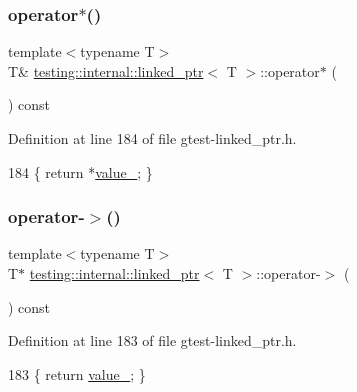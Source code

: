 \subsubsection{\texorpdfstring{operator$\ast$()}{operator*()}}
{\footnotesize\ttfamily template$<$typename T$>$ \\
T\& \hyperlink{classtesting_1_1internal_1_1linked__ptr}{testing\+::internal\+::linked\+\_\+ptr}$<$ T $>$\+::operator$\ast$ (\begin{DoxyParamCaption}{ }\end{DoxyParamCaption}) const\hspace{0.3cm}{\ttfamily [inline]}}



Definition at line 184 of file gtest-\/linked\+\_\+ptr.\+h.


\begin{DoxyCode}
184 \{ \textcolor{keywordflow}{return} *\hyperlink{classtesting_1_1internal_1_1linked__ptr_abb52c4e944fc7a24a4ec7788b612fb37}{value\_}; \}
\end{DoxyCode}
\mbox{\label{classtesting_1_1internal_1_1linked__ptr_a23ff85ac97eed03e945034b65c8eb900}} 
\subsubsection{\texorpdfstring{operator-\/$>$()}{operator->()}}
{\footnotesize\ttfamily template$<$typename T$>$ \\
T$\ast$ \hyperlink{classtesting_1_1internal_1_1linked__ptr}{testing\+::internal\+::linked\+\_\+ptr}$<$ T $>$\+::operator-\/$>$ (\begin{DoxyParamCaption}{ }\end{DoxyParamCaption}) const\hspace{0.3cm}{\ttfamily [inline]}}



Definition at line 183 of file gtest-\/linked\+\_\+ptr.\+h.


\begin{DoxyCode}
183 \{ \textcolor{keywordflow}{return} \hyperlink{classtesting_1_1internal_1_1linked__ptr_abb52c4e944fc7a24a4ec7788b612fb37}{value\_}; \}
\end{DoxyCode}
\mbox{\label{classtesting_1_1internal_1_1linked__ptr_a82608d98869b750d9ab729f1450a9a45}} 
